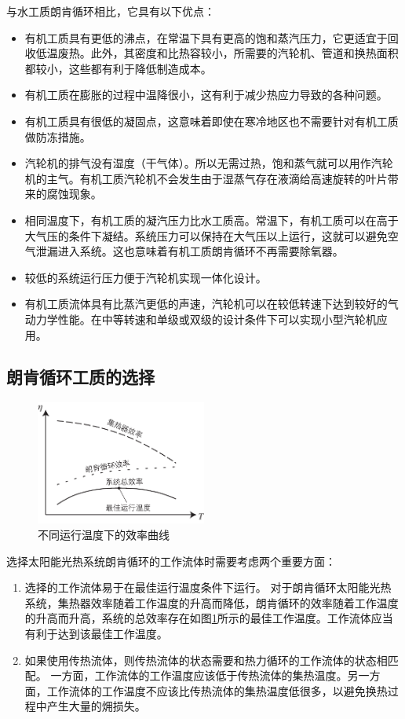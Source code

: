 与水工质朗肯循环相比，它具有以下优点：
\begin{itemize}
    \item 有机工质具有更低的沸点，在常温下具有更高的饱和蒸汽压力，它更适宜于回收低温废热。此外，其密度和比热容较小，所需要的汽轮机、管道和换热面积都较小，这些都有利于降低制造成本。
    \item 有机工质在膨胀的过程中温降很小，这有利于减少热应力导致的各种问题。
    \item 有机工质具有很低的凝固点，这意味着即使在寒冷地区也不需要针对有机工质做防冻措施。
    \item 汽轮机的排气没有湿度（干气体）。所以无需过热，饱和蒸气就可以用作汽轮机的主气。有机工质汽轮机不会发生由于湿蒸气存在液滴给高速旋转的叶片带来的腐蚀现象。
    \item 相同温度下，有机工质的凝汽压力比水工质高。常温下，有机工质可以在高于大气压的条件下凝结。系统压力可以保持在大气压以上运行，这就可以避免空气泄漏进入系统。这也意味着有机工质朗肯循环不再需要除氧器。
    \item 较低的系统运行压力便于汽轮机实现一体化设计。
    \item 有机工质流体具有比蒸汽更低的声速，汽轮机可以在较低转速下达到较好的气动力学性能。在中等转速和单级或双级的设计条件下可以实现小型汽轮机应用。
  \end{itemize}
  
\subsection{朗肯循环工质的选择}
\begin{figure}[!ht]
\centering 
\includegraphics[width=0.5\textwidth]{fig/Efficiency}
\caption{不同运行温度下的效率曲线}\label{fig:Efficiency}
\end{figure}
选择太阳能光热系统朗肯循环的工作流体时需要考虑两个重要方面：
\begin{enumerate}
  \item 选择的工作流体易于在最佳运行温度条件下运行。
 对于朗肯循环太阳能光热系统，集热器效率随着工作温度的升高而降低，朗肯循环的效率随着工作温度的升高而升高，系统的总效率存在如图\ref{fig:Efficiency}所示的最佳工作温度。工作流体应当有利于达到该最佳工作温度。    
  \item 如果使用传热流体，则传热流体的状态需要和热力循环的工作流体的状态相匹配。
  一方面，工作流体的工作温度应该低于传热流体的集热温度。另一方面，工作流体的工作温度不应该比传热流体的集热温度低很多，以避免换热过程中产生大量的㶲损失。
\end{enumerate}

